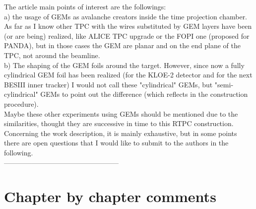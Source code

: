 \documentclass[a4paper,11pt,twoside]{article}
\begin{document}
The article main points of interest are the followings:\\
a)  the usage of GEMs as avalanche creators inside the time projection chamber. As far as I know other TPC with the wires substituted by GEM layers have been (or are being) realized, like ALICE TPC upgrade or the FOPI one (proposed for PANDA), but in those cases the GEM are planar and on the end plane of the TPC, not around the beamline.\\
b) The shaping of the GEM foils around the target. However, since now a fully cylindrical GEM foil has been realized (for the KLOE-2 detector and for the next BESIII inner tracker) I would not call these "cylindrical" GEMs, but "semi-cylindrical" GEMs to point out the difference (which reflects in the construction procedure).\\

Maybe these other experiments using GEMs should be mentioned due to the similarities, thought they are successive in time to this RTPC construction.\\ 

Concerning the work description, it is mainly exhaustive, but in some points there are open questions that I would like to submit to the authors in the following.\\
--------------------------------------------------\\

\section*{Chapter by chapter comments}
\end{document}
